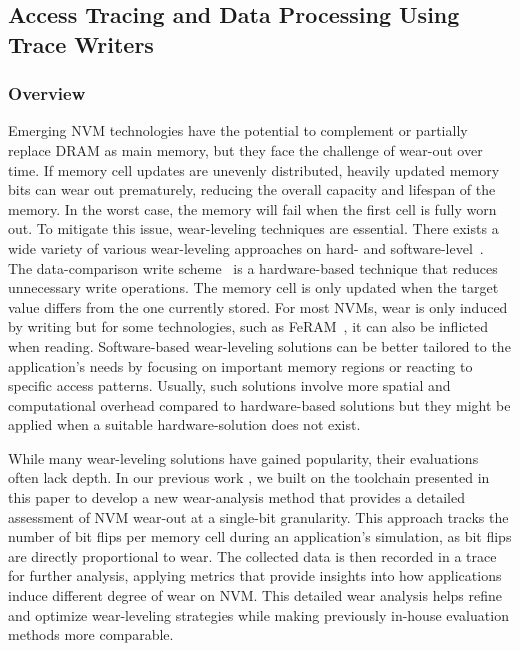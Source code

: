 \subsection{Access Tracing and Data Processing Using Trace Writers}
\label{subsec:tudo}

\subsubsection{Overview}
\label{tudo:overview}
Emerging NVM technologies have the potential to complement or partially replace DRAM as main memory, but they face the challenge of wear-out over time.
If memory cell updates are unevenly distributed, heavily updated memory bits can wear out prematurely, reducing the overall capacity and lifespan of the memory. In the worst case, the memory will fail when the first cell is fully worn out. To mitigate this issue, wear-leveling techniques are essential.
There exists a wide variety of various wear-leveling approaches on hard- and software-level~\cite{yang:2007, PageWL, CacheWL, Loop2RecWL, hoelscher:2022, HeapStackWL, Stack, HeapWL}.
The data-comparison write scheme~\cite{yang:2007} is a hardware-based technique that reduces unnecessary write operations. The memory cell is only updated when the target value differs from the one currently stored. For most NVMs, wear is only induced by writing but for some technologies, such as FeRAM~\cite{philofsky:1996}, it can also be inflicted when reading.
Software-based wear-leveling solutions can be better tailored to the application's needs by focusing on important memory regions or reacting to specific access patterns. Usually, such solutions involve more spatial and computational overhead compared to hardware-based solutions but they might be applied when a suitable hardware-solution does not exist.



While many wear-leveling solutions have gained popularity, their evaluations often lack depth. In our previous work \cite{hoelscher:2023}, we built on the toolchain presented in this paper to develop a new wear-analysis method that provides a detailed assessment of NVM wear-out at a single-bit granularity.
This approach tracks the number of bit flips per memory cell during an application’s simulation, as bit flips are directly proportional to wear. The collected data is then recorded in a trace for further analysis, applying metrics that provide insights into how applications induce different degree of wear on NVM. 
This detailed wear analysis helps refine and optimize wear-leveling strategies while making previously in-house evaluation methods more comparable.

